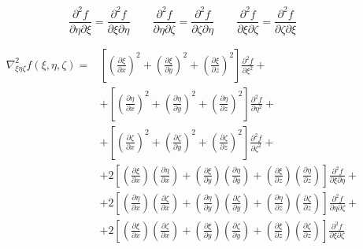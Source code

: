 \documentclass
[
a4paper,                      %
twoside,					  %
12pt,                         %
abstract,		      %
fleqn,                        %
]
{scrartcl} %
\begin{document}
\begin{equation}
\frac{\partial^{2} f}{\partial\eta\partial\xi}=\frac{\partial^{2} f}{\partial\xi\partial\eta}\qquad\frac{\partial^{2} f}{\partial\eta\partial\zeta}=\frac{\partial^{2} f}{\partial\zeta\partial\eta}\qquad\frac{\partial^{2} f}{\partial\xi\partial\zeta}=\frac{\partial^{2} f}{\partial\zeta\partial\xi}
\end{equation}

\begin{equation}
\begin{aligned}
\nabla_{\xi\eta\zeta}^{2}f\left(\xi,\eta,\zeta\right)=&\left[\left(\frac{\partial\xi}{\partial x}\right)^{2}+\left(\frac{\partial\xi}{\partial y}\right)^{2}+\left(\frac{\partial\xi}{\partial z}\right)^{2}\right]\frac{\partial^{2} f}{\partial\xi^{2}}+\\
&+\left[\left(\frac{\partial\eta}{\partial x}\right)^{2}+\left(\frac{\partial\eta}{\partial y}\right)^{2}+\left(\frac{\partial\eta}{\partial z}\right)^{2}\right]\frac{\partial^{2} f}{\partial\eta^{2}}+\\
&+\left[\left(\frac{\partial\zeta}{\partial x}\right)^{2}+\left(\frac{\partial\zeta}{\partial y}\right)^{2}+\left(\frac{\partial\zeta}{\partial z}\right)^{2}\right]\frac{\partial^{2} f}{\partial\zeta^{2}}+\\
&+2\left[\left(\frac{\partial\xi}{\partial x}\right)\left(\frac{\partial\eta}{\partial x}\right)+\left(\frac{\partial\xi}{\partial y}\right)\left(\frac{\partial\eta}{\partial y}\right)+\left(\frac{\partial\xi}{\partial z}\right)\left(\frac{\partial\eta}{\partial z}\right)\right]\frac{\partial^{2} f}{\partial\xi\partial\eta}+\\
&+2\left[\left(\frac{\partial\eta}{\partial x}\right)\left(\frac{\partial\zeta}{\partial x}\right)+\left(\frac{\partial\eta}{\partial y}\right)\left(\frac{\partial\zeta}{\partial y}\right)+\left(\frac{\partial\eta}{\partial z}\right)\left(\frac{\partial\zeta}{\partial z}\right)\right]\frac{\partial^{2} f}{\partial\eta\partial\zeta}+\\
&+2\left[\left(\frac{\partial\xi}{\partial x}\right)\left(\frac{\partial\zeta}{\partial x}\right)+\left(\frac{\partial\xi}{\partial y}\right)\left(\frac{\partial\zeta}{\partial y}\right)+\left(\frac{\partial\xi}{\partial z}\right)\left(\frac{\partial\zeta}{\partial z}\right)\right]\frac{\partial^{2} f}{\partial\xi\partial\zeta}\\
\end{aligned}
\end{equation}
\end{document}
